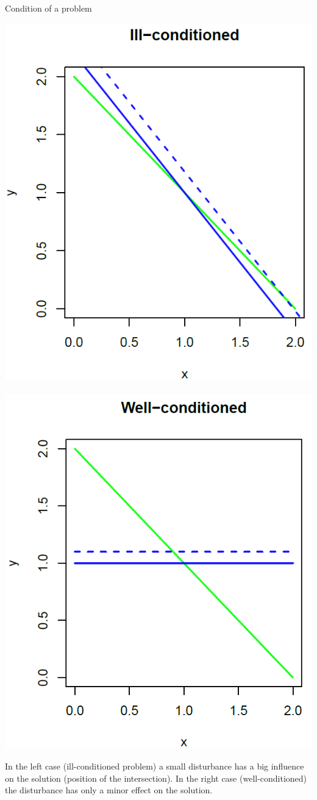 \begin{vbframe}{Condition of a problem}
\begin{center}
\includegraphics[width = 0.4\linewidth]{figure_man/ill-con.png} ~~~ \includegraphics[width = 0.4\linewidth]{figure_man/well-con.png}

\end{center}

\vspace{0.2cm}

\begin{footnotesize}
In the left case (ill-conditioned problem) a small disturbance has a big influence on the solution (position of the intersection).
In the right case (well-conditioned) the disturbance has only a minor effect on the solution.
\end{footnotesize}

\end{vbframe}

